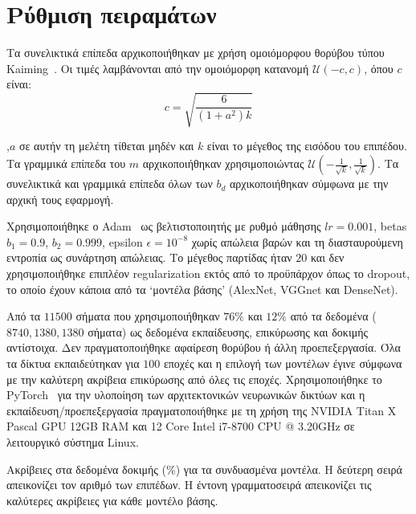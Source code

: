 \section{Ρύθμιση πειραμάτων}
Τα συνελικτικά επίπεδα αρχικοποιήθηκαν με χρήση ομοιόμορφου θορύβου τύπου Kaiming~\cite{he2015delving}. Οι τιμές λαμβάνονται από την ομοιόμορφη κατανομή $\mathcal{U}(-c, c)$, όπου $c$ είναι:
\begin{equation}
	c = \sqrt{\frac{6}{(1 + a^2) k}}
\end{equation}

\noindent
,$a$ σε αυτήν τη μελέτη τίθεται μηδέν και $k$ είναι το μέγεθος της εισόδου του επιπέδου.
Τα γραμμικά επίπεδα του $m$ αρχικοποιήθηκαν χρησιμοποιώντας $\mathcal{U}(-\frac{1}{\sqrt{k}},\frac{1}{\sqrt{k}})$.
Τα συνελικτικά και γραμμικά επίπεδα όλων των $b_d$ αρχικοποιήθηκαν σύμφωνα με την αρχική τους εφαρμογή.

Χρησιμοποιήθηκε ο Adam~\cite{kingma2014adam} ως βελτιστοποιητής με ρυθμό μάθησης $lr=0.001$, betas $b_1=0.9$, $b_2=0.999$, epsilon $\epsilon=10^{-8}$ χωρίς απώλεια βαρών και τη διασταυρούμενη εντροπία ως συνάρτηση απώλειας.
Το μέγεθος παρτίδας ήταν $20$ και δεν χρησιμοποιήθηκε επιπλέον regularization εκτός από το προϋπάρχον όπως το dropout, το οποίο έχουν κάποια από τα `μοντέλα βάσης' (AlexNet, VGGnet και DenseNet).

Από τα $11500$ σήματα που χρησιμοποιήθηκαν $76\%$ και $12\%$ από τα δεδομένα ($8740,1380,1380$ σήματα) ως δεδομένα εκπαίδευσης, επικύρωσης και δοκιμής αντίστοιχα.
Δεν πραγματοποιήθηκε αφαίρεση θορύβου ή άλλη προεπεξεργασία.
Όλα τα δίκτυα εκπαιδεύτηκαν για $100$ εποχές και η επιλογή των μοντέλων έγινε σύμφωνα με την καλύτερη ακρίβεια επικύρωσης από όλες τις εποχές.
Χρησιμοποιήθηκε το PyTorch~\cite{paszke2017automatic} για την υλοποίηση των αρχιτεκτονικών νευρωνικών δικτύων και η εκπαίδευση/προεπεξεργασία πραγματοποιήθηκε με τη χρήση της NVIDIA Titan X Pascal GPU 12GB RAM και 12 Core Intel i7-8700 CPU @ 3.20GHz σε λειτουργικό σύστημα Linux.

\begin{table}
	\caption[Ακρίβειες στα δεδομένα δοκιμής (\%) για τα συνδυασμένα μοντέλα]{Ακρίβειες στα δεδομένα δοκιμής (\%) για τα συνδυασμένα μοντέλα.
	Η δεύτερη σειρά απεικονίζει τον αριθμό των επιπέδων.
	Η έντονη γραμματοσειρά απεικονίζει τις καλύτερες ακρίβειες για κάθε μοντέλο βάσης.}
	\label{table:results}
	\begin{minipage}{\textwidth}
		\centering
		
	\end{minipage}
\end{table}

